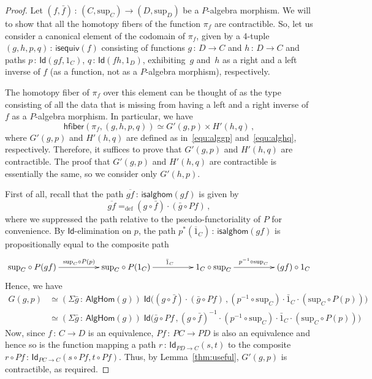 \documentclass[10pt,a4paper,oneside,reqno]{amsart}
\numberwithin{equation}{section}
\theoremstyle{mythm}
\theoremstyle{mydef}
\theoremstyle{myrmk}
\newcommand{\defeq}{=_{\mathrm{def}}}
\newcommand{\co}{\,{:}\,}
\newcommand{\ct}{\cdot}
\newcommand{\hfiber}{\mathsf{hfiber}}
\newcommand{\Id}{\mathsf{Id}}
\renewcommand{\sup}{\mathrm{sup}}
\begin{document}
\begin{proof} Let $(f, \bar{f}) \co (C, \sup_C) \to (D, \sup_D)$ be a  $P$-algebra morphism. We will to
show that all the homotopy fibers of the function $\pi_f$ are contractible.
So, let us consider a canonical element of the codomain of $\pi_f$,  given by a 4-tuple $( g, h, p, q) \co \mathsf{isequiv}(f)$ consisting of functions $g \co D \to C$ and $h \co D \to C$ and paths $p \co \Id(gf, 1_C)$, $q \co \Id(fh, 1_D)$,
exhibiting~$g$ and~$h$ as a right and a left inverse of $f$ (as a function, not as a $P$-algebra morphism), respectively. 

The homotopy fiber of $\pi_f$ over this element can be thought of as the type consisting of all
the data that is missing from having a left and a right inverse of $f$ as a $P$-algebra morphism. 
In particular, we have
\begin{equation*}
\hfiber(\pi_f, (g, h, p, q ) ) \simeq G'(g,p) \times H'(h,q) \, ,
\end{equation*}
where $G'(g,p)$ and $H'(h,q)$ are defined as in~\eqref{equ:alggp} and~\eqref{equ:alghq}, respectively.
Therefore, it suffices to prove that $G'(g,p)$ and $H'(h,q)$ are  contractible.  The proof that $G'(g,p)$ and $H'(h,q)$ are 
contractible is essentially the same, so we consider only $G'(h,p)$.


First of all,  recall that the path $\overline{gf} \co  \mathsf{isalghom}(gf) $ is given by 
\[
\overline{gf} \defeq (g \circ \bar{f}) \ct (\bar{g} \circ Pf ) \, ,
\]
where we suppressed the path relative to the pseudo-functoriality of $P$ for convenience. 
By $\Id$-elimination on $p$, the path $p^*(\overline{1}_C) \co \mathsf{isalghom}(gf)$ is propositionally equal to the composite path
\[
\xymatrix@C=1.7cm{
\sup_C \circ P(gf) \ar[r]^{\sup_C \circ P(p)} & \sup_C \circ P(1_C) \ar[r]^{\bar{1}_C} & 1_C \circ \sup_C \ar[r]^{p^{-1} \circ \sup_C} & 
(g f) \circ 1_C }
\]
Hence, we have 
\begin{align*} 
G(g,p)  & \simeq  (\Sigma \bar{g} \co  \mathsf{AlgHom}(g))  \; 
\Id \big( (g \circ \bar{f}) \ct (\bar{g} \circ Pf ) \, , 
  (p^{-1} \circ \sup_C) \ct \bar{1}_C \ct (\sup_C \circ P(p)) \big) \\
& \simeq 
(\Sigma \bar{g} \co  \mathsf{AlgHom}(g))  \; 
\Id \big( \bar{g} \circ Pf  \, , (g \circ \bar{f})^{-1} \ct 
  (p^{-1} \circ \sup_C) \ct \bar{1}_C \ct (\sup_C \circ P(p)) \big)
\end{align*} 
Now, since $f \co C \to D$ is an equivalence, $Pf \co PC \to PD$ is also an equivalence and hence so
is the function mapping a path $r \co \Id_{PD \to C}(s,t)$ to the composite $r \circ Pf \co \Id_{PC \to C}( s \circ Pf, t \circ Pf)$. Thus, by  Lemma~\ref{thm:useful}, $G'(g,p)$ is contractible, as required.
\end{proof} 
\end{document}
